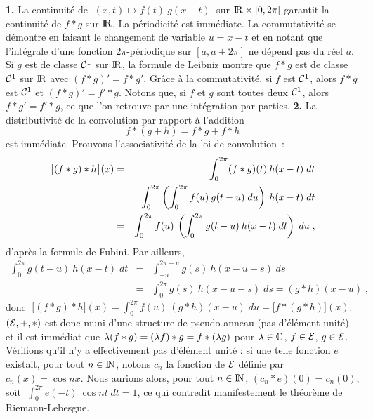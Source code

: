 \documentclass{article}
\begin{document}
{\bf 1.} La continuit\'e de $\;(x,t)\mapsto f(t)\>g(x-t)\;$ sur ${\rm I\kern-0.6mm R}\times
[0,2\pi]$ garantit la continuit\'e de $f*g$ sur ${\rm I\kern-0.6mm R}$. La p\'eriodicit\'e est
imm\'ediate.\ssk\sect
La commutativit\'e se d\'emontre en faisant le changement de variable $u=x-t$
et en notant que l'int\'egrale d'une fonction $2\pi$-p\'eriodique sur
$[a,a+2\pi]$ ne d\'epend pas du r\'eel $a$.\ssk\sect
Si $g$ est de classe ${\cal C}^1$ sur ${\rm I\kern-0.6mm R}$, la formule de Leibniz montre que
$f*g$ est de classe ${\cal C}^1$ sur ${\rm I\kern-0.6mm R}$ avec $(f*g)'=f*g'$.
Gr\^ace \`a la commutativit\'e, si $f$ est ${\cal C}^1$, alors $f*g$ est ${\cal C}^1$ et
$(f*g)'=f'*g$. Notons que, si $f$ et $g$ sont toutes deux ${\cal C}^1$,
alors $f*g'=f'*g$, ce que l'on retrouve par une int\'egration par parties.
\msk
{\bf 2.} La distributivit\'e de la convolution par rapport \`a l'addition\vvv
$$f*(g+h)=f*g+f*h$$\sect
est imm\'ediate.\ssk\sect
Prouvons l'associativit\'e de la loi de convolution~:\vv
\begin{eqnarray*}
\big[(f*g)*h\big](x) & = & \int_0^{2\pi}(f*g)(t)\>h(x-t)\;dt\\
                                & = & \int_0^{2\pi}\left(\int_0^{2\pi}f(u)\>
                                       g(t-u)\;du\right)\>h(x-t)\;dt\\
                                & = & \int_0^{2\pi}f(u)\>\left(\int_0^{2\pi}
                                       g(t-u)\>h(x-t)\;dt\right)\;du\;,
\end{eqnarray*}
d'apr\`es la formule de Fubini. Par ailleurs,\vv
\begin{eqnarray*}
\int_0^{2\pi}g(t-u)\>h(x-t)\;dt & = & \int_{-u}^{2\pi-u}g(s)\>
                                                  h(x-u-s)\;ds\\
                                           & = & \int_0^{2\pi}g(s)\>h(x-u-s)\;
                                                  ds=(g*h)(x-u)\;,
\end{eqnarray*}
donc $\;\big[(f*g)*h\big](x)=\int_0^{2\pi}f(u)\>(g*h)(x-u)\;du=\big[f*(g*h)
\big](x)$.\ssk\sect
$({\cal E},+,*)$ est donc muni d'une structure de pseudo-anneau (pas
d'\'el\'ement unit\'e) et il est imm\'ediat que $\lambda (f*g)=(\lambda f)*g=f*(\lambda g)$
pour $\lam\in\cmat$, $f\in {\cal E}$, $g\in {\cal E}$.\msk\sect
V\'erifions qu'il n'y a effectivement pas d'\'el\'ement unit\'e : si une telle fonction $e$
existait, pour tout $n\in{\rm I\kern-0.5mm N}$, notons $c_n$ la fonction de ${\cal E}$ d\'efinie
par $c_n(x)=\cos nx$. Nous aurions alors, pour tout $n\in{\rm I\kern-0.5mm N}$,
$(c_n*e)(0)=c_n(0)$, soit $\;\int_0^{2\pi}e(-t)\>\cos nt\;dt=1$, ce
qui contredit manifestement le th\'eor\`eme de Riemann-Lebesgue.
\end{document}

